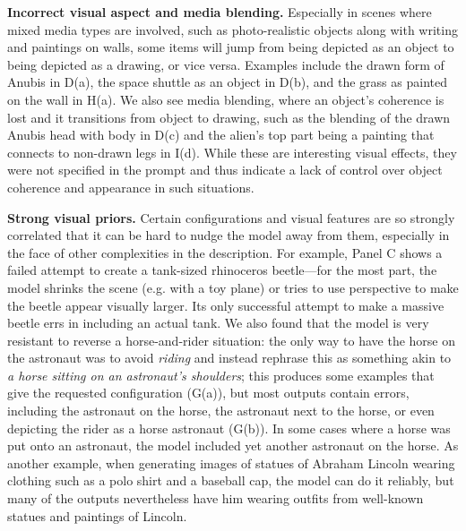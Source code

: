 \textbf{Incorrect visual aspect and media blending.} Especially in scenes where mixed media types are involved, such as photo-realistic objects along with writing and paintings on walls, some items will jump from being depicted as an object to being depicted as a drawing, or vice versa. Examples include the drawn form of Anubis in D(a), the space shuttle as an object in D(b), and the grass as painted on the wall in H(a). We also see media blending, where an object's coherence is lost and it transitions from object to drawing, such as the blending of the drawn Anubis head with body in D(c) and the alien's top part being a painting that connects to non-drawn legs in I(d). While these are interesting visual effects, they were not specified in the prompt and thus indicate a lack of control over object coherence and appearance in such situations.

\textbf{Strong visual priors.} Certain configurations and visual features are so strongly correlated that it can be hard to nudge the model away from them, especially in the face of other complexities in the description. For example, Panel C shows a failed attempt to create a tank-sized rhinoceros beetle---for the most part, the model shrinks the scene (e.g. with a toy plane) or tries to use perspective to make the beetle appear visually larger. Its only successful attempt to make a massive beetle errs in including an actual tank. We also found that the model is very resistant to reverse a horse-and-rider situation: the only way to have the horse on the astronaut was to avoid \textit{riding} and instead rephrase this as something akin to \textit{a horse sitting on an astronaut's shoulders}; this produces some examples that give the requested configuration (G(a)), but most outputs contain errors, including the astronaut on the horse, the astronaut next to the horse, or even depicting the rider as a horse astronaut (G(b)). In some cases where a horse was put onto an astronaut, the model included yet another astronaut on the horse. As another example, when generating images of statues of Abraham Lincoln wearing clothing such as a polo shirt and a baseball cap, the model can do it reliably, but many of the outputs nevertheless have him wearing outfits from well-known statues and paintings of Lincoln.

